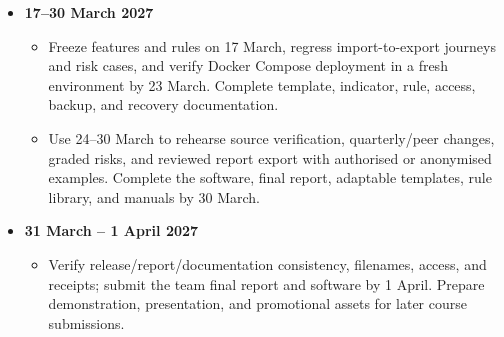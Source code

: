 \documentclass[a4paper,12pt]{article}
\begin{document}
\begin{itemize}
  \item \textbf{17--30 March 2027}
    \begin{itemize}
      \item Freeze features and rules on 17 March, regress import-to-export journeys and risk cases, and verify Docker Compose deployment in a fresh environment by 23 March. Complete template, indicator, rule, access, backup, and recovery documentation.
      \item Use 24--30 March to rehearse source verification, quarterly/peer changes, graded risks, and reviewed report export with authorised or anonymised examples. Complete the software, final report, adaptable templates, rule library, and manuals by 30 March.
    \end{itemize}

  \item \textbf{31 March -- 1 April 2027}
    \begin{itemize}
      \item Verify release/report/documentation consistency, filenames, access, and receipts; submit the team final report and software by 1 April. Prepare demonstration, presentation, and promotional assets for later course submissions.
    \end{itemize}

\end{itemize}

\clearpage
\end{document}
